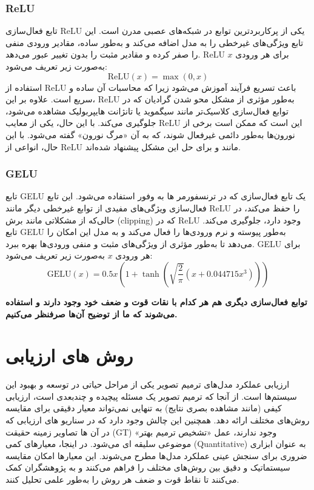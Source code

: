 \subsubsection{ReLU}
تابع فعال‌سازی ReLU%
یکی از پرکاربردترین توابع در شبکه‌های عصبی مدرن است. این تابع ویژگی‌های غیرخطی را به مدل اضافه می‌کند و به‌طور ساده، مقادیر ورودی منفی را صفر کرده و مقادیر مثبت را بدون تغییر عبور می‌دهد. ReLU برای هر ورودی $x$ به‌صورت زیر تعریف می‌شود:
$$
\text{ReLU}(x) = \max(0, x)
$$
استفاده از ReLU باعث تسریع فرآیند آموزش می‌شود زیرا که محاسبات آن ساده و سریع است. علاوه بر این، ReLU به‌طور مؤثری از مشکل محو شدن گرادیان که در توابع فعال‌سازی کلاسیک‌تر مانند سیگموید یا تانژانت هایپربولیک مشاهده می‌شود، جلوگیری می‌کند. با این حال، یکی از معایب ReLU این است که ممکن است برخی از نورون‌ها به‌طور دائمی غیرفعال شوند، که به آن «مرگ نورون» گفته می‌شود. با این حال، انواعی از ReLU مانند  و  برای حل این مشکل پیشنهاد شده‌اند.


\subsubsection{GELU}
تابع GELU%
یک تابع فعال‌سازی که در ترنسفورمر ها به وفور استفاده می‌شود.  این تابع فعال‌سازی ویژگی‌های مفیدی از توابع غیرخطی دیگر مانند ReLU را حفظ می‌کند، در حالی‌که از مشکلاتی مانند برش (clipping) که در ReLU وجود دارد، جلوگیری می‌کند. تابع GELU به‌طور پیوسته و نرم ورودی‌ها را فعال می‌کند و به مدل این امکان را می‌دهد تا به‌طور مؤثری از ویژگی‌های مثبت و منفی ورودی‌ها بهره ببرد. GELU برای هر ورودی $x$ به‌صورت زیر تعریف می‌شود:
$$
\text{GELU}(x) = 0.5x \left( 1 + \tanh\left( \sqrt{\frac{2}{\pi}}(x + 0.044715x^3) \right) \right)
$$

\textbf{توابع فعال‌سازی دیگری هم هر کدام با نقات قوت و ضعف خود وجود دارند و استفاده می‌شوند که ما از توضیح آن‌ها صرفنظر می‌کنیم.}



\section{روش های ارزیابی}

ارزیابی عملکرد مدل‌های ترمیم تصویر یکی از مراحل حیاتی در توسعه و بهبود این سیستم‌ها است. از آنجا که ترمیم تصویر یک مسئله پیچیده و چندبعدی است، ارزیابی کیفی (مانند مشاهده بصری نتایج) به تنهایی نمی‌تواند معیار دقیقی برای مقایسه روش‌های مختلف ارائه دهد. همچنین این چالش وجود دارد که در سناریو های ارزیابی که در آن ها تصاویر زمینه حقیقت (GT) وجود ندارند، عمل «تشخیص ترمیم بهتر» موضوعی سلیقه ای می‌شود. در اینجا، معیارهای کمی (Quantitative) به عنوان ابزاری ضروری برای سنجش عینی عملکرد مدل‌ها مطرح می‌شوند. این معیارها امکان مقایسه سیستماتیک و دقیق بین روش‌های مختلف را فراهم می‌کنند و به پژوهشگران کمک می‌کنند تا نقاط قوت و ضعف هر روش را به‌طور علمی تحلیل کنند.
